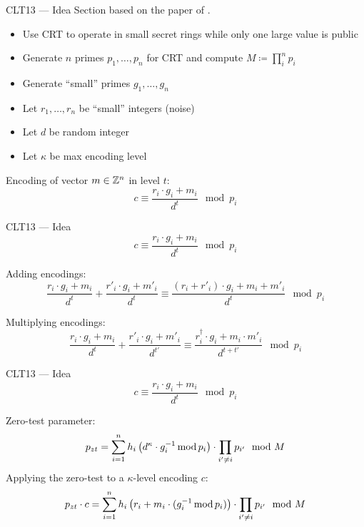 \documentclass[english]{beamer}
\begin{document}
    \begin{frame}{CLT13 --- Idea}
        Section based on the paper of .

        \begin{itemize}
            \item Use CRT to operate in small secret rings while only one large value is public
            \item Generate $n$ primes $p_1, \dots, p_n$ for CRT and compute $M \coloneqq \prod_i^n p_i$
            \item Generate \enquote{small} primes $g_1, \dots, g_n$
            \item Let $r_1, \dots, r_n$ be \enquote{small} integers (noise)
            \item Let $d$ be random integer
            \item Let $\kappa$ be max encoding level
        \end{itemize}

        Encoding of vector $m \in \mathbb{Z}^n$ in level $t$:
        \begin{equation*}
            c \equiv \frac{r_i \cdot g_i + m_i}{d^t} \mod p_i
        \end{equation*}
    \end{frame}
    \begin{frame}{CLT13 --- Idea}
        \begin{equation*}
            c \equiv \frac{r_i \cdot g_i + m_i}{d^t} \mod p_i
        \end{equation*}

        Adding encodings:
        \begin{equation*}
            \frac{r_i \cdot g_i + m_i}{d^t} + \frac{r'_i \cdot g_i + m'_i}{d^t} \equiv \frac{(r_i + r'_i) \cdot g_i + m_i + m'_i}{d^t} \mod p_i
        \end{equation*}

        Multiplying encodings:
        \begin{equation*}
            \frac{r_i \cdot g_i + m_i}{d^t} + \frac{r'_i \cdot g_i + m'_i}{d^{t'}} \equiv \frac{r^\dagger_i \cdot g_i + m_i \cdot m'_i}{d^{t + t'}} \mod p_i
        \end{equation*}
    \end{frame}
    \begin{frame}{CLT13 --- Idea}
        \begin{equation*}
            c \equiv \frac{r_i \cdot g_i + m_i}{d^t} \mod p_i
        \end{equation*}

        Zero-test parameter:
        \begin{equation*}
            p_{zt} = \sum_{i=1}^n h_i \left(d^\kappa \cdot g_i^{-1} \operatorname{mod} p_i\right) \cdot \prod_{i' \neq i} p_{i'} \mod M
        \end{equation*}
        \pause
        Applying the zero-test to a $\kappa$-level encoding $c$:
        \begin{equation*}
            p_{zt} \cdot c = \sum_{i=1}^n h_i \left(r_i + m_i \cdot (g_i^{-1} \operatorname{mod} p_i)\right) \cdot \prod_{i' \neq i} p_{i'} \mod M
        \end{equation*}
    \end{frame}
\end{document}
